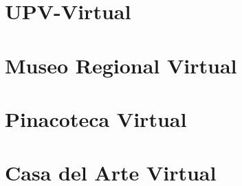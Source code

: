 \documentclass[aspectratio=169,compress]{beamer}
\begin{document}
 



\section{UPV-Virtual}
\section{Museo Regional Virtual}

\section{Pinacoteca Virtual}

\section{Casa del Arte Virtual}

\end{document}
